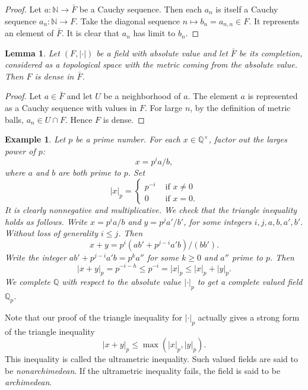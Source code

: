 \documentclass{amsart}
\newcommand{\ring}[1]{\mathbb{#1}}
\newtheorem{lemma}[equation]{Lemma}
\newtheorem{example}[exercise]{Example}
\def\newterm#1{{\it #1}}
\def\abs#1{{|#1|}}
\begin{document}
\begin{proof} Let $a:\ring{N}\to \bar F$ be a Cauchy sequence.
Then each $a_n$ is itself a Cauchy sequence $a_n:\ring{N}\to F$.
Take the diagonal sequence $n\mapsto b_n = a_{n,n}\in F$.  It represents an
element of $\bar F$.  It is clear that $a_n$ has limit
to $b_n$.
\end{proof}


\begin{lemma} Let $(F,\abs{\cdot})$ be a field with absolute value and
let $\bar F$ be its completion, considered as a topological space with
the metric coming from the absolute value.  Then $F$ is dense in $\bar F$.
\end{lemma}

\begin{proof} Let $a\in \bar F$ and let $U$ be a neighborhood of $a$.
  The element $a$ is represented as a Cauchy sequence with values in
  $F$.  For large $n$, by the definition of metric balls, $a_n\in
  U\cap F$.  Hence $F$ is dense.
\end{proof}

\begin{example} Let $p$ be a prime number.  For each
  $x\in\ring{Q}^\times$, factor out the larges power of $p$:
\[
x = p^i a/b,
\]
where $a$ and $b$ are both prime to $p$.
Set
\[
\abs{x}_p = \begin{cases} p^{-i}&\text{ if } x\ne 0\\
  0&\text{ if } x = 0.
  \end{cases}
\]
It is clearly nonnegative and multiplicative.  We check that the
triangle inequality holds as follows.  Write $x = p^i a/b$ and $y =
p^j a'/b'$, for some integers $i,j,a,b,a',b'$.  Without loss of
generality $i\le j$.  Then
\[
x + y = p^i (a b' + p^{j-i} a' b)/(b b').
\]
Write the integer $a b' + p^{j-i} a' b = p^k a''$ for some $k\ge 0$
and $a''$ prime to $p$.  Then
\[
\abs{x+y}_p = p^{-i-h} \le p^{-i} = \abs{x}_p \le \abs{x}_p + \abs{y}_p.
\]
We complete $\ring{Q}$ with respect to the absolute value
$\abs{\cdot}_p$ to get a complete valued field $\ring{Q}_p$.
\end{example}

Note that our proof of the triangle inequality for $\abs{\cdot}_p$ actually
gives a strong form of the triangle inequality
\[
\abs{x+y}_p \le \max(\abs{x}_p,\abs{y}_p).
\]
This inequality is called the ultrametric inequality.  Such valued fields
are said to be \newterm{nonarchimedean}.  If the ultrametric inequality fails,
the field is said to be \newterm{archimedean}.
\end{document}
